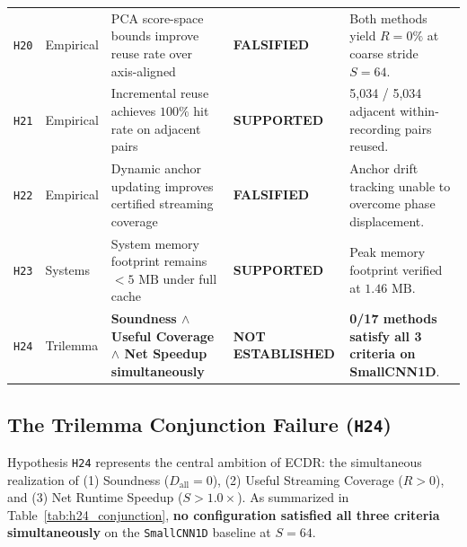 \documentclass[journal,onecolumn,10pt]{IEEEtran}
\newcommand{\code}[1]{{\small\ttfamily\nolinkurl{#1}}}
\theoremstyle{remark}
\begin{document}
\begin{table}[!htbp]
{\begin{tabular}{@{}llP{5.2cm}lP{4.2cm}@{}}
\code{H20} & Empirical & PCA score-space bounds improve reuse rate over axis-aligned & \textcolor{warnred}{\textbf{FALSIFIED}} & Both methods yield $R = 0\%$ at coarse stride $S=64$. \\
\code{H21} & Empirical & Incremental reuse achieves $100\%$ hit rate on adjacent pairs & \textcolor{okgreen}{\textbf{SUPPORTED}} & 5,034 / 5,034 adjacent within-recording pairs reused. \\
\code{H22} & Empirical & Dynamic anchor updating improves certified streaming coverage & \textcolor{warnred}{\textbf{FALSIFIED}} & Anchor drift tracking unable to overcome phase displacement. \\
\code{H23} & Systems & System memory footprint remains $< 5\text{ MB}$ under full cache & \textcolor{okgreen}{\textbf{SUPPORTED}} & Peak memory footprint verified at $1.46\text{ MB}$. \\
\code{H24} & Trilemma & \textbf{Soundness $\land$ Useful Coverage $\land$ Net Speedup simultaneously} & \textcolor{warnred}{\textbf{NOT ESTABLISHED}} & \textbf{0/17 methods satisfy all 3 criteria on SmallCNN1D}. \\
\bottomrule
\end{tabular}%
}
\end{table}

\subsection{The Trilemma Conjunction Failure (\texorpdfstring{\code{H24}}{H24})}
Hypothesis \code{H24} represents the central ambition of ECDR: the simultaneous realization of (1) Soundness ($D_{\text{all}} = 0$), (2) Useful Streaming Coverage ($R > 0$), and (3) Net Runtime Speedup ($S > 1.0\times$). As summarized in Table~\ref{tab:h24_conjunction}, \textbf{no configuration satisfied all three criteria simultaneously} on the \code{SmallCNN1D} baseline at $S=64$.
\end{document}
